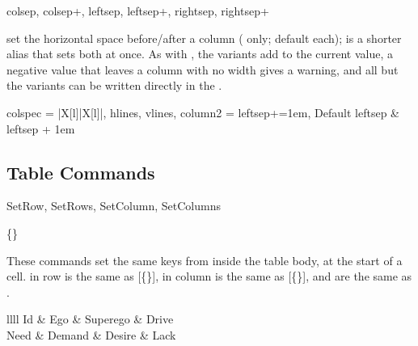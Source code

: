 \begin{codedescribe}[
    key,
    new=2021G,
    update=2021L,
    update=2026A
  ]{colsep, colsep+, leftsep, leftsep+, rightsep, rightsep+}
  \begin{codesyntax}
  \end{codesyntax}
   set the horizontal space before/after a column ( only; default \val{6pt} each);  is a shorter alias that sets both at once. As with , the \key[no index]{+} variants add to the current value, a negative value that leaves a column with no width gives a warning, and all but the \key[no index]{+} variants can be written directly in the .

  \begin{codestore}[st=columns:sepplus]
    \begin{tblr}{
      colspec = {|X[l]|X[l]|},
      hlines, vlines,
      column{2} = {leftsep+=1em},
      }
      Default leftsep & leftsep + 1em
    \end{tblr}\end{codestore}
  \begin{center}
  \end{center}
\end{codedescribe}

\subsection{Table Commands}
\begin{codedescribe}[
    code,
    new=2021F
  ]{SetRow, SetRows, SetColumn, SetColumns}
  \begin{codesyntax}
    \{\} 
  \end{codesyntax}
  These commands set the same keys from inside the table body, at the start of a cell.  in row  is the same as [\{\}],  in column  is the same as [\{\}], and  are the same as .

  \begin{codestore}[st=columns:setrow]
    \begin{tblr}{llll}
      \hline
       Id        &  Ego & Superego & Drive \\
      \hline
       Need & Demand            & Desire   & Lack  \\
      \hline
    \end{tblr}\end{codestore}
  \begin{center}
  \end{center}
\end{codedescribe}

